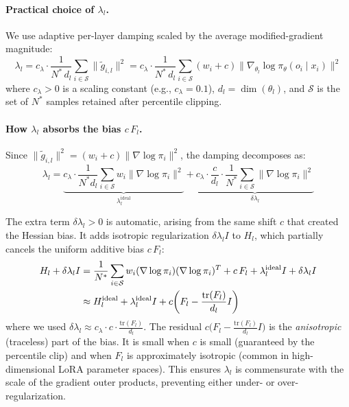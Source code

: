 \documentclass{article}
\begin{document}
\paragraph{Practical choice of $\lambda_l$.}
We use adaptive per-layer damping scaled by the average modified-gradient magnitude:
\begin{equation}\label{eq:damping}
    \lambda_l = c_\lambda \cdot \frac{1}{N^*\,d_l}\sum_{i\in\mathcal{S}}\|\tilde{g}_{i,l}\|^2
    = c_\lambda \cdot \frac{1}{N^*\,d_l}\sum_{i\in\mathcal{S}}(w_i+c)\|\nabla_{\theta_l}\log\pi_\theta(o_i\mid x_i)\|^2
\end{equation}
where $c_\lambda > 0$ is a scaling constant (e.g., $c_\lambda = 0.1$), $d_l = \dim(\theta_l)$, and $\mathcal{S}$ is the set of $N^*$ samples retained after percentile clipping.

\paragraph{How $\lambda_l$ absorbs the bias $c\,F_l$.}
Since $\|\tilde{g}_{i,l}\|^2 = (w_i+c)\|\nabla\log\pi_i\|^2$, the damping decomposes as:
\begin{equation}
    \lambda_l
    = \underbrace{c_\lambda\cdot\frac{1}{N^*d_l}\sum_{i\in\mathcal{S}} w_i\|\nabla\log\pi_i\|^2}_{\lambda_l^{\mathrm{ideal}}}
    + \underbrace{c_\lambda\cdot\frac{c}{d_l}\cdot\frac{1}{N^*}\sum_{i\in\mathcal{S}}\|\nabla\log\pi_i\|^2}_{\delta\lambda_l}
\end{equation}

The extra term $\delta\lambda_l > 0$ is automatic, arising from the same shift $c$ that created the Hessian bias.
It adds isotropic regularization $\delta\lambda_l I$ to $H_l$, which partially cancels the uniform additive bias $c\,F_l$:
\begin{align}
    H_l + \delta\lambda_l I
    &= \frac{1}{N^*}\sum_{i\in\mathcal{S}}w_i(\nabla\log\pi_i)(\nabla\log\pi_i)^T
      + c\,F_l + \lambda_l^{\mathrm{ideal}} I + \delta\lambda_l I \notag\\
    &\approx H_l^{\mathrm{ideal}} + \lambda_l^{\mathrm{ideal}} I
      + c\!\left(F_l - \frac{\mathrm{tr}(F_l)}{d_l}I\right)
\end{align}
where we used $\delta\lambda_l \approx c_\lambda \cdot c \cdot \frac{\mathrm{tr}(F_l)}{d_l}$.
The residual $c\bigl(F_l - \frac{\mathrm{tr}(F_l)}{d_l}I\bigr)$ is the \emph{anisotropic} (traceless) part of the bias.
It is small when $c$ is small (guaranteed by the percentile clip) and when $F_l$ is approximately isotropic (common in high-dimensional LoRA parameter spaces).
This ensures $\lambda_l$ is commensurate with the scale of the gradient outer products, preventing either under- or over-regularization.
\end{document}
